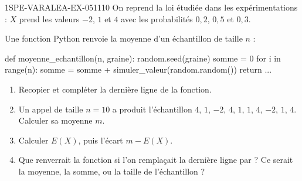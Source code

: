 \begin{exercice}{1SPE-VARALEA-EX-051}{1}{10}
On reprend la loi étudiée dans les expérimentations : $X$ prend les valeurs
$-2$, $1$ et $4$ avec les probabilités $0{,}2$, $0{,}5$ et $0{,}3$.

Une fonction Python renvoie la moyenne d'un échantillon de taille $n$ :

\begin{python}
def moyenne_echantillon(n, graine):
    random.seed(graine)
    somme = 0
    for i in range(n):
        somme = somme + simuler_valeur(random.random())
    return ...
\end{python}

\begin{enumerate}
  \item Recopier et compléter la dernière ligne de la fonction.
  \item Un appel de taille $n=10$ a produit l'échantillon
        $4$, $1$, $-2$, $4$, $1$, $1$, $4$, $-2$, $1$, $4$.
        Calculer sa moyenne $m$.
  \item Calculer $E(X)$, puis l'écart $m - E(X)$.
  \item Que renverrait la fonction si l'on remplaçait la dernière ligne par
         ? Ce serait la moyenne, la somme, ou la taille de
        l'échantillon ?
\end{enumerate}
\end{exercice}
